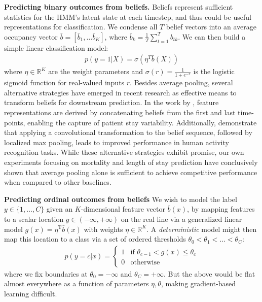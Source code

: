 \textbf{Predicting binary outcomes from beliefs.}
Beliefs represent sufficient statistics for the HMM's latent state at each timestep, and thus could be useful representations for classification.
We condense all $T$ belief vectors into an average occupancy vector 
$\bar{b} = [\bar{b}_1, \ldots \bar{b}_K]$, where $\bar{b}_k = \frac{1}{T} \sum_{t=1}^T b_{tk}$.
We can then build a simple linear classification model:
\begin{align}
    p( y = 1 | X) = \sigma( \eta^T \bar{b}(X)) 
    \label{eq:binary_classification}
\end{align}
where $\eta \in \mathbb{R}^K$ are the weight parameters and $\sigma(r) = \frac{1}{1 + e^{-r}}$ is the logistic sigmoid function for real-valued inputs $r$. Besides average pooling, several alternative strategies have emerged in recent research as effective means to transform beliefs for downstream prediction. In the work by \cite{sotoodeh2019improving}, feature representations are derived by concatenating beliefs from the first and last time-points, enabling the capture of patient stay variability. Additionally,  \cite{hopePredictionConstrainedHiddenMarkov2021} demonstrate that applying a convolutional transformation to the belief sequence, followed by localized max pooling, leads to improved performance in human activity recognition tasks. 
While these alternative strategies exhibit promise, our own experiments focusing on mortality and length of stay prediction have conclusively shown that average pooling alone is sufficient to achieve competitive performance when compared to other baselines.

\textbf{Predicting ordinal outcomes from beliefs}
We wish to model the label $y \in \{1, \ldots, C\}$ given an $K$-dimensional feature vector $\bar{b}(x)$,
by
mapping features to a scalar location $g \in (-\infty, +\infty)$ on the real line via a generalized linear model $g(x) = \eta^\text{T} \bar{b}(x)$ with weights $\eta \in \mathbb{R}^K$.
A \emph{deterministic} model might then map this location to a class via a set of ordered thresholds $\theta_0 < \theta_1 < \ldots < \theta_C$:
\begin{align}
p( y = c | x) =     
    \begin{cases}
      1 & \text{if $\theta_{c-1} < g(x) \leq \theta_{c}$} \\
      0 & \text{otherwise}
    \end{cases} 
    \label{eq:deterministic_lik}
\end{align}
where we fix boundaries at $\theta_0 = -\infty$ and $\theta_C = +\infty$.
But the above would be flat almost everywhere as a function of parameters $\eta, \theta$, making gradient-based learning difficult. 

